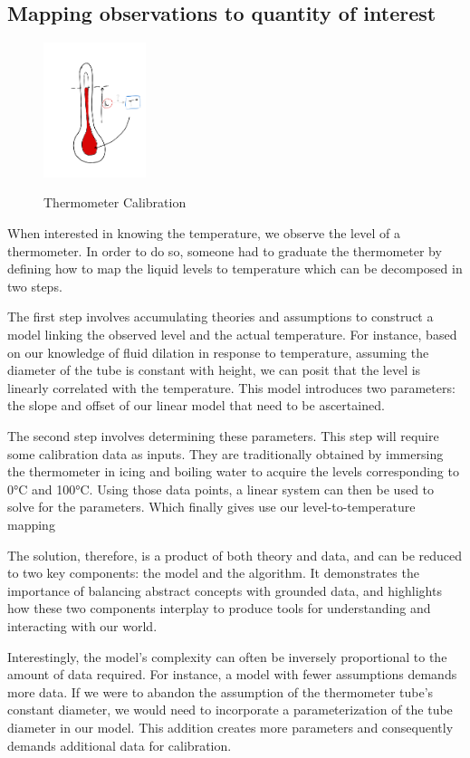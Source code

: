 \begin{bibunit}
\subsection{Mapping observations to quantity of interest}
\begin{figure}[h]
    \centering
        \includegraphics[clip, width=3cm]{Introduction/pics/therm_pb.png}     \\
    \caption{Thermometer Calibration}
    \label{fig:therm_calib}
\end{figure}


When interested in knowing the temperature, we observe the level of a thermometer.
In order to do so, someone had to graduate the thermometer by defining how to map the liquid levels to temperature which can be decomposed in two steps. 

The first step involves accumulating theories and assumptions to construct a model linking the observed level and the actual temperature.
For instance, based on our knowledge of fluid dilation in response to temperature, assuming the diameter of the tube is constant with height, we can posit that the level is linearly correlated with the temperature.
This model introduces two parameters: the slope and offset of our linear model that need to be ascertained.

The second step involves determining these parameters. This step will require some calibration data as inputs. They are traditionally obtained by immersing the thermometer in icing and boiling water to acquire the levels corresponding to 0°C and 100°C.
  Using those data points, a linear system can then be used to solve for the parameters. Which finally gives use our level-to-temperature mapping


The solution, therefore, is a product of both theory and data, and can be reduced to two key components: the model and the algorithm. It demonstrates the importance of balancing abstract concepts with grounded data, and highlights how these two components interplay to produce tools for understanding and interacting with our world.

Interestingly, the model's complexity can often be inversely proportional to the amount of data required. For instance, a model with fewer assumptions demands more data. If we were to abandon the assumption of the thermometer tube's constant diameter, we would need to incorporate a parameterization of the tube diameter in our model. This addition creates more parameters and consequently demands additional data for calibration.


\end{bibunit}
